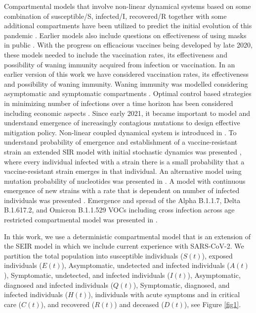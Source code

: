 \documentclass[10pt]{wlscirep}
\begin{document}
Compartmental models that involve non-linear dynamical systems based on some combination of susceptible/S, infected/I, recovered/R together with some additional compartments have been utilized to predict the initial evolution of this pandemic \cite{Giordano2020, KUCHARSKI2020553, refId0, ACUNAZEGARRA2020108370, XIANG2021324, ACUNAZEGARRA2020108370}. Earlier models also include questions on effectiveness of using masks in public \cite{EIKENBERRY2020293}. With the progress on efficacious vaccines being developed by late 2020, these models needed to include the vaccination rates, its effectiveness and possibility of waning immunity acquired from infection or vaccination\cite{YYL2021}. In an earlier version of this work \cite{Ghosh2020} we have considered vaccination rates, its effectiveness and possibility of waning immunity. Waning immunity was modelled considering asymptomatic and symptomatic compartments \cite{ANGGRIANI2022113}. Optimal control based strategies in minimizing number of infections over a time horizon has been considered including economic aspects \cite{NARAIGH2020108496}. Since early 2021, it became  important to model and understand emergence of increasingly contagious mutations to design effective mitigation policy\cite{abk3445}. Non-linear coupled dynamical system is introduced in \cite{Dutta2022}. To understand probability of emergence and establishment of a vaccine-resistant strain an extended SIR model with initial stochastic dynamics was presented \cite{Rella21}, where every individual infected with a strain there is a small probability that a vaccine-resistant strain emerges in that individual. An alternative model using mutation probability of nucleotides was presented in \cite{Marquioni21}. A model with continuous emergence of new strains with a rate that is dependent on number of infected individuals was presented \cite{Schwarzendahl22}.  Emergence and spread of the Alpha B.1.1.7, Delta B.1.617.2, and Omicron B.1.1.529 VOCs including cross infection across age restricted compartmental model was presented in \cite{Barnard22}.

In this work, we use a deterministic compartmental model that is an extension of the SEIR model \cite{Peng2020.02.16.20023465,doi:10.1098/rspb.2004.2800} in which we include current experience with SARS-CoV-2. We partition the total population into susceptible individuals ($S(t)$), exposed individuals ($E(t)$), Asymptomatic, undetected and infected individuals ($A(t)$), Symptomatic, undetected, and infected individuals ($I(t)$), Asymptomatic, diagnosed and infected individuals ($Q(t)$), Symptomatic, diagnosed, and infected individuals ($H(t)$), individuals with acute symptoms and in critical care ($C(t)$), and recovered ($R(t)$) and deceased ($D(t)$), see Figure \ref{fig1}.
\end{document}
